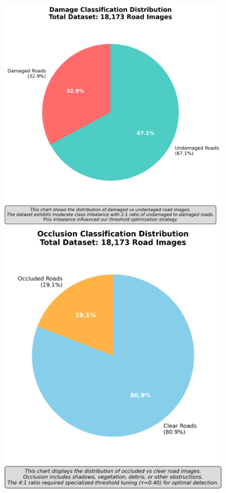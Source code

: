 \documentclass[12pt]{article}
\begin{document}
\begin{figure}[!htb]
\centering
\begin{minipage}{0.32\textwidth}
\centering
\includegraphics[width=\textwidth]{images/damage_classification_distribution.png}
\end{minipage}
\hfill
\begin{minipage}{0.32\textwidth}
\centering
\includegraphics[width=\textwidth]{images/occlusion_classification_distribution.png}

\end{minipage}
\end{figure}
\end{document}
